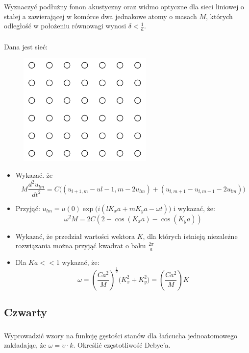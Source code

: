 \subsubsection{}
Wyznaczyć podłużny fonon akustyczny oraz widmo optyczne dla sieci liniowej o stałej a zawierającej w komórce dwa jednakowe atomy o masach $M$, których odległość w położeniu równowagi wynosi $\delta < \frac{1}{a}$.


\subsubsection{}
Dana jest sieć:
\begin{figure}[h!]
\centering
\includegraphics[scale=0.9]{images/zes3-5}
\end{figure}
\begin{itemize}
\item Wykazać. że
\[M\frac{d^2u_{lm}}{dt^2} = C\big( (u_{l+1,m} - u{l-1,m} - 2u_{lm}) + (u_{l,m+1} - u_{l,m-1} -2u_{lm}) \big)\]
\item Przyjąć: $u_{lm} = u(0) \exp\big( i(lK_xa + mK_ya - \omega t) \big)$ i wykazać, że:
\[ \omega^2 M= 2C(2-\cos (K_xa) - \cos(K_ya) ) \]
\item Wykazać, że przedział wartości wektora $K$, dla których istnieją niezależne rozwiązania można przyjąć kwadrat o baku $\frac{2\pi}{a}$
\item Dla $Ka <<1$ wykazać, że:
\[ \omega = \left( \frac{Ca^2}{M} \right)^{\frac{1}{2}} \big( K_x^2 + K_y^2 \big) = \left( \frac{Ca^2}{M} \right) K \]
\end{itemize}


\subsection{Czwarty}
\subsubsection{}
\label{subsubsec:41}
Wyprowadzić wzory na funkcję gęstości stanów dla łańcucha jednoatomowego zakładając, że $\omega = \upsilon \cdot k$. Określić częstotliwość Debye'a.



